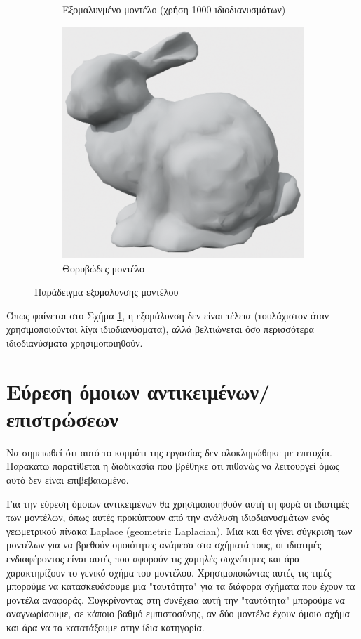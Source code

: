 \documentclass{article}
\begin{document}
\begin{figure}[h]
\begin{subfigure}{0.4\textwidth}
		\caption{Εξομαλυνμένο μοντέλο (χρήση 1000 ιδιοδιανυσμάτων)}
	\end{subfigure}
	\begin{subfigure}{0.4\textwidth}
		\includegraphics[width=\textwidth]{"noisy_mesh.png"}
		\caption{Θορυβώδες μοντέλο}
	\end{subfigure}
	\caption{Παράδειγμα εξομαλυνσης μοντέλου}
	\label{fig:simplify}
\end{figure}

Όπως φαίνεται στο Σχήμα \ref{fig:simplify}, η εξομάλυνση δεν είναι τέλεια
(τουλάχιστον όταν χρησιμοποιούνται λίγα ιδιοδιανύσματα), αλλά βελτιώνεται όσο
περισσότερα ιδιοδιανύσματα χρησιμοποιηθούν.

\section{Εύρεση όμοιων αντικειμένων/επιστρώσεων}
\label{recognition}
Να σημειωθεί ότι αυτό το κομμάτι της εργασίας δεν ολοκληρώθηκε με επιτυχία.
Παρακάτω παρατίθεται η διαδικασία που βρέθηκε ότι πιθανώς να λειτουργεί όμως αυτό δεν
είναι επιβεβαιωμένο.

Για την εύρεση όμοιων αντικειμένων θα χρησιμοποιηθούν αυτή τη φορά οι ιδιοτιμές
των μοντέλων, όπως αυτές προκύπτουν από την ανάλυση ιδιοδιανυσμάτων ενός γεωμετρικού
πίνακα Laplace (geometric Laplacian).
Μια και θα γίνει σύγκριση των μοντέλων για να βρεθούν ομοιότητες ανάμεσα στα σχήματά τους,
οι ιδιοτιμές ενδιαφέροντος είναι αυτές που αφορούν τις χαμηλές συχνότητες
και άρα χαρακτηρίζουν το γενικό σχήμα του μοντέλου. Χρησιμοποιώντας αυτές τις τιμές
μπορούμε να κατασκευάσουμε μια "ταυτότητα" για τα διάφορα σχήματα που έχουν τα
μοντέλα αναφοράς.
Συγκρίνοντας στη συνέχεια αυτή την "ταυτότητα" μπορούμε να αναγνωρίσουμε,
σε κάποιο βαθμό εμπιστοσύνης,
αν δύο μοντέλα έχουν όμοιο σχήμα και άρα να τα κατατάξουμε στην ίδια κατηγορία.
\end{document}

